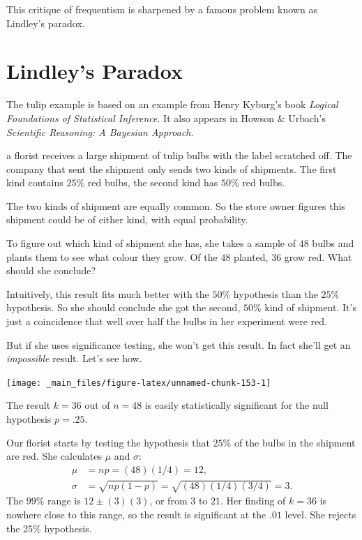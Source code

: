 \documentclass[justified]{tufte-book}
\theoremstyle{definition}
\theoremstyle{definition}
\theoremstyle{definition}
\theoremstyle{remark}
\begin{document}
This critique of frequentism is sharpened by a famous problem known as
Lindley's paradox.

\hypertarget{lindleys-paradox}{%
\section{Lindley's Paradox}\label{lindleys-paradox}}

\begin{marginfigure}
The tulip example is based on an example from Henry Kyburg's book
\emph{Logical Foundations of Statistical Inference}. It also appears in
Howson \& Urbach's \emph{Scientific Reasoning: A Bayesian Approach}.
\end{marginfigure}

 a florist receives a large shipment of tulip bulbs
with the label scratched off. The company that sent the shipment only
sends two kinds of shipments. The first kind contains \(25\%\) red
bulbs, the second kind has \(50\%\) red bulbs.

The two kinds of shipment are equally common. So the store owner figures
this shipment could be of either kind, with equal probability.

To figure out which kind of shipment she has, she takes a sample of
\(48\) bulbs and plants them to see what colour they grow. Of the \(48\)
planted, \(36\) grow red. What should she conclude?

Intuitively, this result fits much better with the \(50\%\) hypothesis
than the \(25\%\) hypothesis. So she should conclude she got the second,
\(50\%\) kind of shipment. It's just a coincidence that well over half
the bulbs in her experiment were red.

But if she uses significance testing, she won't get this result. In fact
she'll get an \emph{impossible} result. Let's see how.

\begin{marginfigure}
\texttt{[image: \_main\_files/figure-latex/unnamed-chunk-153-1]} \caption[The result $k = 36$ out of $n = 48$ is easily statistically significant for the null hypothesis $p = .25$]{The result $k = 36$ out of $n = 48$ is easily statistically significant for the null hypothesis $p = .25$.}\label{fig:unnamed-chunk-153}
\end{marginfigure}

Our florist starts by testing the hypothesis that \(25\%\) of the bulbs
in the shipment are red. She calculates \(\mu\) and \(\sigma\): \[
  \begin{aligned}
    \mu &= np = (48)(1/4) = 12,\\
    \sigma &= \sqrt{np(1-p)} = \sqrt{(48)(1/4)(3/4)} = 3.
  \end{aligned}
\] The \(99\%\) range is \(12 \pm (3)(3)\), or from \(3\) to \(21\). Her
finding of \(k = 36\) is nowhere close to this range, so the result is
significant at the \(.01\) level. She rejects the \(25\%\) hypothesis.
\end{document}
